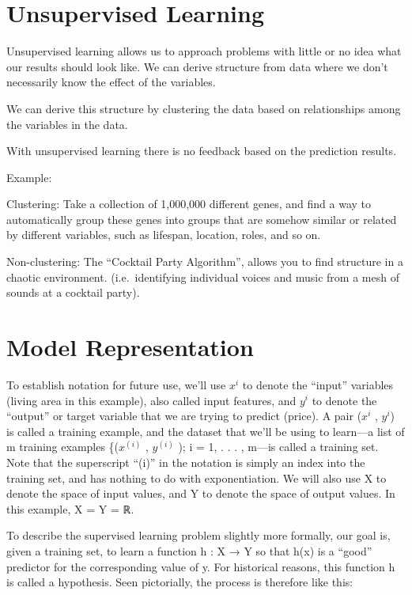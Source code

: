 \documentclass[
]{book}
\begin{document}
\hypertarget{unsupervised-learning}{%
\section{Unsupervised Learning}\label{unsupervised-learning}}

Unsupervised learning allows us to approach problems with little or no idea what our results should look like. We can derive structure from data where we don't necessarily know the effect of the variables.

We can derive this structure by clustering the data based on relationships among the variables in the data.

With unsupervised learning there is no feedback based on the prediction results.

Example:

Clustering: Take a collection of 1,000,000 different genes, and find a way to automatically group these genes into groups that are somehow similar or related by different variables, such as lifespan, location, roles, and so on.

Non-clustering: The ``Cocktail Party Algorithm'', allows you to find structure in a chaotic environment. (i.e.~identifying individual voices and music from a mesh of sounds at a cocktail party).

\hypertarget{model-representation}{%
\section{Model Representation}\label{model-representation}}

To establish notation for future use, we'll use \(x^{i}\) to denote the ``input'' variables (living area in this example), also called input features, and \(y^{i}\) to denote the ``output'' or target variable that we are trying to predict (price). A pair (\(x^{i}\) , \(y^{i}\)) is called a training example, and the dataset that we'll be using to learn---a list of m training examples \{(\(x^{(i)}\) , \(y^{(i)}\) ); i = 1, . . . , m---is called a training set. Note that the superscript ``(i)'' in the notation is simply an index into the training set, and has nothing to do with
exponentiation. We will also use X to denote the space of input values, and Y to
denote the space of output values. In this example, X = Y = ℝ.

To describe the supervised learning problem slightly more formally, our goal is,
given a training set, to learn a function h : X → Y so that h(x) is a ``good''
predictor for the corresponding value of y. For historical reasons, this function
h is called a hypothesis. Seen pictorially, the process is therefore like this:
\end{document}
